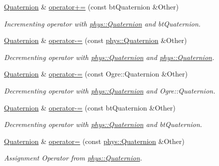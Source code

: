 \begin{DoxyCompactItemize}
\hyperlink{classphys_1_1Quaternion}{Quaternion} \& \hyperlink{classphys_1_1Quaternion_ab167530770fb0463c5473b5f533db9a8}{operator+=} (const btQuaternion \&Other)
\begin{DoxyCompactList}\small\item\em Incrementing operator with \hyperlink{classphys_1_1Quaternion}{phys::Quaternion} and btQuaternion. \item\end{DoxyCompactList}\item 
\hyperlink{classphys_1_1Quaternion}{Quaternion} \& \hyperlink{classphys_1_1Quaternion_a66086148dd9154e3e3e0b46bacafe0f7}{operator-\/=} (const \hyperlink{classphys_1_1Quaternion}{phys::Quaternion} \&Other)
\begin{DoxyCompactList}\small\item\em Decrementing operator with \hyperlink{classphys_1_1Quaternion}{phys::Quaternion} and \hyperlink{classphys_1_1Quaternion}{phys::Quaternion}. \item\end{DoxyCompactList}\item 
\hyperlink{classphys_1_1Quaternion}{Quaternion} \& \hyperlink{classphys_1_1Quaternion_af62037687eea0005c9fc4a09355656ed}{operator-\/=} (const Ogre::Quaternion \&Other)
\begin{DoxyCompactList}\small\item\em Decrementing operator with \hyperlink{classphys_1_1Quaternion}{phys::Quaternion} and Ogre::Quaternion. \item\end{DoxyCompactList}\item 
\hyperlink{classphys_1_1Quaternion}{Quaternion} \& \hyperlink{classphys_1_1Quaternion_abd1e9d740b3af194c60466105d07f6ff}{operator-\/=} (const btQuaternion \&Other)
\begin{DoxyCompactList}\small\item\em Decrementing operator with \hyperlink{classphys_1_1Quaternion}{phys::Quaternion} and btQuaternion. \item\end{DoxyCompactList}\item 
\hyperlink{classphys_1_1Quaternion}{Quaternion} \& \hyperlink{classphys_1_1Quaternion_a6213bddf8f928a8510260b9deb712fd7}{operator=} (const \hyperlink{classphys_1_1Quaternion}{phys::Quaternion} \&Other)
\begin{DoxyCompactList}\small\item\em Assignment Operator from \hyperlink{classphys_1_1Quaternion}{phys::Quaternion}. \item\end{DoxyCompactList}\item 

\end{DoxyCompactItemize}
